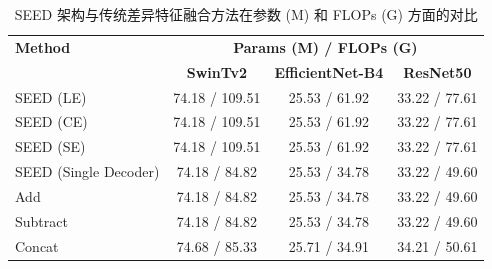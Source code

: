 
\begin{table}[!htbp]
  \centering
  \caption{SEED 架构与传统差异特征融合方法在参数 (M) 和 FLOPs (G) 方面的对比}
  \label{tab:seed_params_gflops}
  \begin{tabular}{l|ccc}
    \hline
    \textbf{Method}
      & \multicolumn{3}{c}{\textbf{Params (M) / FLOPs (G)}} \\
    \cline{2-4}
      & \textbf{SwinTv2} & \textbf{EfficientNet-B4} & \textbf{ResNet50} \\
    \hline
    SEED (LE)               & 74.18 / 109.51 & 25.53 / 61.92  & 33.22 / 77.61 \\
    SEED (CE)               & 74.18 / 109.51 & 25.53 / 61.92  & 33.22 / 77.61 \\
    SEED (SE)               & 74.18 / 109.51 & 25.53 / 61.92  & 33.22 / 77.61 \\
    \hline
    SEED (Single Decoder)   & 74.18 / 84.82  & 25.53 / 34.78  & 33.22 / 49.60 \\
    \hline
    Add                     & 74.18 / 84.82  & 25.53 / 34.78  & 33.22 / 49.60 \\
    Subtract                & 74.18 / 84.82  & 25.53 / 34.78  & 33.22 / 49.60 \\
    \hline
    Concat                  & 74.68 / 85.33  & 25.71 / 34.91  & 34.21 / 50.61 \\
    \hline
  \end{tabular}
\end{table}


